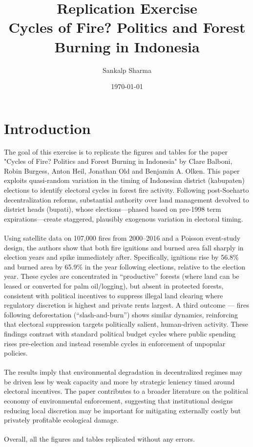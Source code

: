 \documentclass[11pt,a4paper]{article}
\begin{document}
\title{Replication Exercise  \\ 
Cycles of Fire? Politics and Forest Burning in Indonesia}

\author{Sankalp Sharma}
\date{\today}

\maketitle

\section{Introduction}

The goal of this exercise is to replicate the figures and tables for the paper "Cycles of Fire? Politics and Forest Burning in Indonesia" by Clare Balboni, Robin Burgess, Anton Heil, Jonathan Old and Benjamin A. Olken. This paper exploits quasi-random variation in the timing of Indonesian district (kabupaten) elections to identify electoral cycles in forest fire activity. Following post-Soeharto decentralization reforms, substantial authority over land management devolved to district heads (bupati), whose elections—phased based on pre-1998 term expirations—create staggered, plausibly exogenous variation in electoral timing. 
\\
\\
Using satellite data on 107,000 fires from 2000–2016 and a Poisson event-study design, the authors show that both fire ignitions and burned area fall sharply in election years and spike immediately after. Specifically, ignitions rise by 56.8\% and burned area by 65.9\% in the year following elections, relative to the election year. These cycles are concentrated in “productive” forests (where land can be leased or converted for palm oil/logging), but absent in protected forests, consistent with political incentives to suppress illegal land clearing where regulatory discretion is highest and private rents largest. A third outcome — fires following deforestation (“slash-and-burn”) shows similar dynamics, reinforcing that electoral suppression targets politically salient, human-driven activity. These findings contrast with standard political budget cycles where public spending rises pre-election and instead resemble cycles in enforcement of unpopular policies. 
\\
\\
The results imply that environmental degradation in decentralized regimes may be driven less by weak capacity and more by strategic leniency timed around electoral incentives. The paper contributes to a broader literature on the political economy of environmental enforcement, suggesting that institutional designs reducing local discretion may be important for mitigating externally costly but privately profitable ecological damage.
\\
\\
Overall, all the figures and tables replicated without any errors. 
\end{document}

